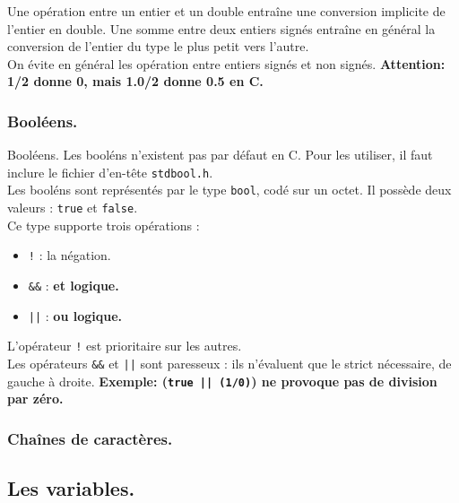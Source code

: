 \documentclass[french, 11pt]{article}
\begin{document}
\begin{defi}{}{}
    Une opération entre un entier et un double entraîne une conversion implicite de l'entier en double. Une somme entre deux entiers signés entraîne en général la conversion de l'entier du type le plus petit vers l'autre.\\
    On évite en général les opération entre entiers signés et non signés.\n
    \bf{Attention:} 1/2 donne 0, mais 1.0/2 donne 0.5 en C.
\end{defi}

\subsubsection{Booléens.}
\begin{defi}{Booléens.}{}
    Les booléns n'existent pas par défaut en C. Pour les utiliser, il faut inclure le fichier d'en-tête \texttt{stdbool.h}.\\
    Les booléns sont représentés par le type \texttt{bool}, codé sur un octet. Il possède deux valeurs : \texttt{true} et \texttt{false}.\\
    Ce type supporte trois opérations :
    \begin{itemize}[topsep=0pt,itemsep=-0.9 ex, label=---]
        \item \texttt{!} : la négation.
        \item \texttt{\&\&} : \bf{et} logique.
        \item \texttt{||} : \bf{ou} logique.
    \end{itemize}
    L'opérateur \texttt{!} est prioritaire sur les autres.\\
    Les opérateurs \texttt{\&\&} et \texttt{||} sont paresseux : ils n'évaluent que le strict nécessaire, de gauche à droite.\n
    \bf{Exemple:} (\texttt{true || (1/0)}) ne provoque pas de division par zéro.
\end{defi}

\subsubsection{Chaînes de caractères.}

\begin{center}
\end{center}

\subsection{Les variables.}
\end{document}
